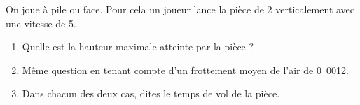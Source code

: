 

\begin{exercice}\label{exo039}

On joue à pile ou face. Pour cela un joueur lance la pièce de \unit{2}{\gram} verticalement avec une vitesse de \unit{5}{\meter\per\second}.

\begin{enumerate}
\item Quelle est la hauteur maximale atteinte par la pièce ?
\item Même question en tenant compte d'un frottement moyen de l'air de \unit{0.0012}{\newton}.
\item Dans chacun des deux cas, dites le temps de vol de la pièce.
\end{enumerate}
\setcounter{bidon}{\value{enumi}}

\end{exercice}
